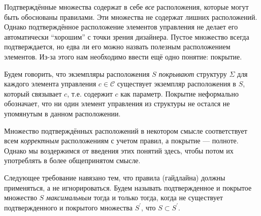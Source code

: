 Подтверждённые множества содержат в себе \emph{все} расположения, которые могут быть обоснованы правилами.
Эти множества не содержат лишних расположений. Однако подтверждённое расположение элементов управления не делает его автоматически \enquote{хорошим} с точки зрения дизайнера. Пустое множество всегда подтверждается, но едва ли его можно назвать   полезным расположением элементов. Из-за этого нам необходимо ввести ещё одно понятие: покрытие.


Будем говорить, что экземпляры расположения $S$ \emph{покрывают} структуру $\Sigma$ \iffr{} для каждого элемента управления $c\in\mathcal{C}$
существует экземпляр расположения  в  $S$, который связывает $c$, т.е. содержит $c$ как параметр. Покрытие неформально обозначает, что  ни один элемент управления из структуры не остался не упомянутым в данном расположении.


Множество подтверждённых расположений в некотором смысле  соответствует всем \emph{корректным} расположениям с учетом правил,
а покрытие --- полноте. Однако мы воздержимся от введения этих понятий здесь, чтобы потом их употреблять в более общепринятом смысле.


Следующее требование навязано тем, что правила (гайдлайна) должны применяться, а не игнорироваться.
Будем называть подтвержденное и покрытое множество  $S$ \emph{максимальным} тогда и только тогда, когда не существует
подтвержденного и покрытого множества  $S^\prime$, что $S\subset S^\prime$.

